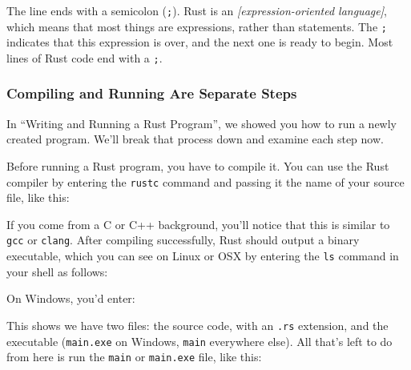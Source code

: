 \documentclass[a4paper,]{book}
\newenvironment{Shaded}{\begin{snugshade}}{\end{snugshade}}
\newcommand{\KeywordTok}[1]{\textcolor[rgb]{0.13,0.29,0.53}{\textbf{{#1}}}}
\newcommand{\NormalTok}[1]{{#1}}
\begin{document}
The line ends with a semicolon (\texttt{;}). Rust is an
\emph{{[}expression-oriented language{]}}, which means that most things
are expressions, rather than statements. The \texttt{;} indicates that
this expression is over, and the next one is ready to begin. Most lines
of Rust code end with a \texttt{;}.

\subsubsection{Compiling and Running Are Separate
Steps}\label{compiling-and-running-are-separate-steps}

In ``Writing and Running a Rust Program'', we showed you how to run a
newly created program. We'll break that process down and examine each
step now.

Before running a Rust program, you have to compile it. You can use the
Rust compiler by entering the \texttt{rustc} command and passing it the
name of your source file, like this:

\begin{Shaded}
\end{Shaded}

If you come from a C or C++ background, you'll notice that this is
similar to \texttt{gcc} or \texttt{clang}. After compiling successfully,
Rust should output a binary executable, which you can see on Linux or
OSX by entering the \texttt{ls} command in your shell as follows:

\begin{Shaded}
\end{Shaded}

On Windows, you'd enter:

\begin{Shaded}
\end{Shaded}

This shows we have two files: the source code, with an \texttt{.rs}
extension, and the executable (\texttt{main.exe} on Windows,
\texttt{main} everywhere else). All that's left to do from here is run
the \texttt{main} or \texttt{main.exe} file, like this:
\end{document}
